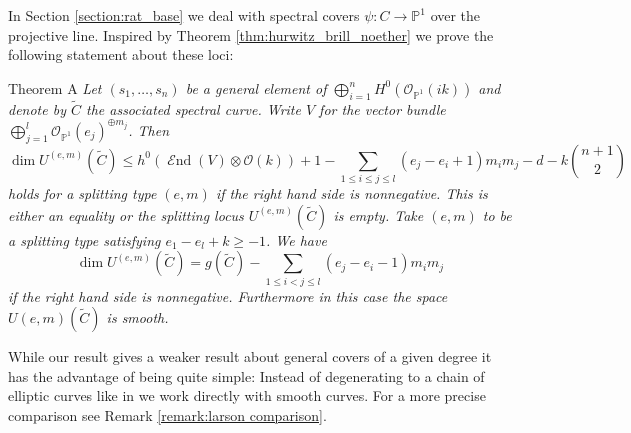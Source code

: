 \documentclass[12pt]{extarticle}
\theoremstyle{definition}
\numberwithin{theorem}{section}
\newcommand{\thistheoremname}{}
\newtheorem*{genericthm*}{\thistheoremname}
\newenvironment{namedthm*}[1]
{\renewcommand{\thistheoremname}{#1}%
	\begin{genericthm*}}
	{\end{genericthm*}}
\newcommand{\PP}{\mathbb{P}}
\newcommand{\OO}{\mathcal{O}}
\DeclareMathOperator{\End}{\mathcal{E}nd}
\renewcommand{\tilde}{\widetilde}		%
\begin{document}
In Section \ref{section:rat_base} we deal with spectral covers $ \psi: C \rightarrow \PP^1$ over the projective line. Inspired by Theorem \ref{thm:hurwitz_brill_noether} we prove the following statement about these loci:
\begin{namedthm*}{Theorem A}\label{thm:dim_split_loci}
\emph{
Let $(s_1,\ldots,s_n)$ be a general element of $\bigoplus_{i=1}^n H^0(\OO_{\PP^1}(ik))$ and denote by $\tilde{C}$ the associated spectral curve. Write $V$ for the vector bundle $\bigoplus_{j=1}^l \OO_{\PP^1}(e_j)^{\oplus m_j}$.
Then 
\begin{equation}\label{eq:dim_bn_loci}
\dim U^{(e,m)}(\tilde{C}) \leq h^0(\End(V) \otimes \OO(k)) + 1-  \sum_{1\leq i \leq j \leq l}(e_j - e_i+1)m_im_j - d - k\binom{n+1}{2}
\end{equation}
holds for a splitting type $(e,m)$ if the right hand side is nonnegative. This is either an equality or the splitting locus $U^{(e,m)}(\tilde{C})$ is empty.
Take $(e,m)$ to be a splitting type satisfying $e_1 - e_l + k\geq -1$.   We have
\begin{equation}\label{eq:dim_split_loci}
\dim U^{(e,m)}(\tilde{C}) = g(\tilde{C}) - \sum_{1 \leq i < j\leq l}(e_j - e_i -1 )m_im_j 
\end{equation}
if the right hand side is nonnegative.
Furthermore in this case the space $U{(e,m)}(\tilde{C})$ is smooth.
}
\end{namedthm*} 
While our result gives a weaker result about general covers of a given degree it has the advantage of being quite simple: Instead of degenerating to a chain of elliptic curves like in \cite{Hlarson} we work directly with smooth curves. For a more precise comparison see Remark \ref{remark:larson comparison}.
\end{document}
